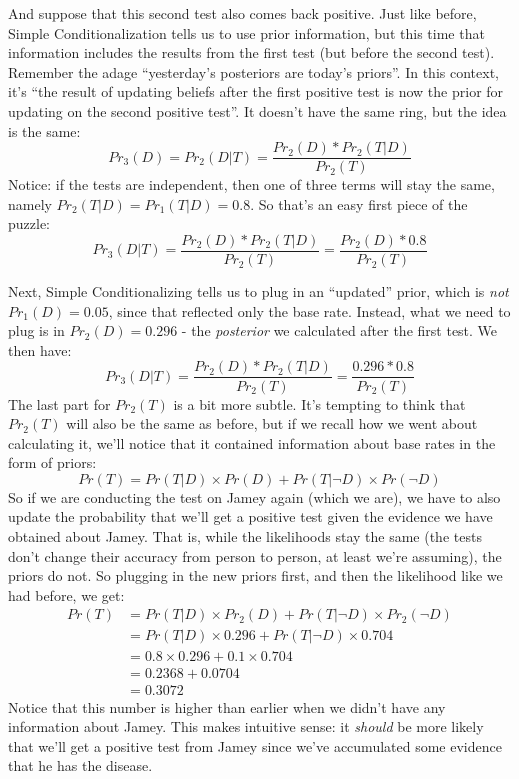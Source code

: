 \documentclass[]{tufte-book}
\begin{document}
 And suppose that this second test also comes back positive. Just like before, Simple Conditionalization tells us to use prior information, but this time that information includes the results from the first test (but before the second test). Remember the adage ``yesterday's posteriors are today's priors''. In this context, it's ``the result of updating beliefs after the first positive test is now the prior for updating on the second positive test''. It doesn't have the same ring, but the idea is the same:
\[Pr_3(D)=Pr_2(D|T)=\frac{Pr_2(D)*Pr_2(T|D)}{Pr_2(T)}\]
Notice: if the tests are independent, then one of three terms will stay the same, namely \(Pr_2(T|D)=Pr_1(T|D)=0.8\). So that's an easy first piece of the puzzle: \[Pr_3(D|T)=\frac{Pr_2(D)*Pr_2(T|D)}{Pr_2(T)}=\frac{Pr_2(D)*0.8}{Pr_2(T)}\]

Next, Simple Conditionalizing tells us to plug in an ``updated'' prior, which is \emph{not} \(Pr_1(D) = 0.05\), since that reflected only the base rate. Instead, what we need to plug is in \(Pr_2(D)=0.296\) - the \emph{posterior} we calculated after the first test. We then have:
\[Pr_3(D|T)=\frac{Pr_2(D)*Pr_2(T|D)}{Pr_2(T)}=\frac{0.296*0.8}{Pr_2(T)}\]
The last part for \(Pr_2(T)\) is a bit more subtle. It's tempting to think that \(Pr_2(T)\) will also be the same as before, but if we recall how we went about calculating it, we'll notice that it contained information about base rates in the form of priors: \[Pr(T) = Pr(T|D)\times Pr(D) + Pr(T|\neg D)\times Pr(\neg D)\]
So if we are conducting the test on Jamey again (which we are), we have to also update the probability that we'll get a positive test given the evidence we have obtained about Jamey. That is, while the likelihoods stay the same (the tests don't change their accuracy from person to person, at least we're assuming), the priors do not. So plugging in the new priors first, and then the likelihood like we had before, we get:
\[
  \begin{aligned}
  Pr(T) &= Pr(T|D)\times Pr_2(D) + Pr(T|\neg D)\times Pr_2(\neg D)\\
        &= Pr(T|D)\times 0.296 + Pr(T|\neg D)\times 0.704\\
        &= 0.8\times 0.296 + 0.1 \times 0.704\\
        &= 0.2368 + 0.0704\\
        &= 0.3072
  \end{aligned}
\]
Notice that this number is higher than earlier when we didn't have any information about Jamey. This makes intuitive sense: it \emph{should} be more likely that we'll get a positive test from Jamey since we've accumulated some evidence that he has the disease.
\end{document}
